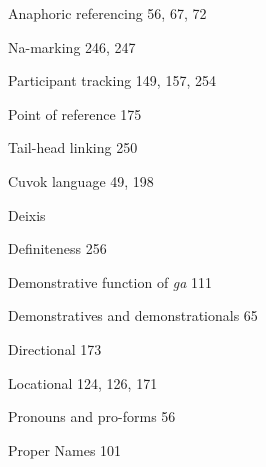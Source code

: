 \begin{multicols}{2}
\begin{styleindexii}
Anaphoric referencing  56, 67, 72
\end{styleindexii}

\begin{styleindexii}
Na-marking  246, 247
\end{styleindexii}

\begin{styleindexii}
Participant tracking  149, 157, 254
\end{styleindexii}

\begin{styleindexii}
Point of reference  175
\end{styleindexii}

\begin{styleindexii}
Tail-head linking  250
\end{styleindexii}

\begin{styleindexi}
Cuvok language  49, 198
\end{styleindexi}

\begin{styleindexi}
Deixis
\end{styleindexi}

\begin{styleindexii}
Definiteness  256
\end{styleindexii}

\begin{styleindexii}
Demonstrative function of \textit{ga}  111
\end{styleindexii}

\begin{styleindexii}
Demonstratives and demonstrationals  65
\end{styleindexii}

\begin{styleindexii}
Directional  173
\end{styleindexii}

\begin{styleindexii}
Locational  124, 126, 171
\end{styleindexii}

\begin{styleindexii}
Pronouns and pro-forms  56
\end{styleindexii}

\begin{styleindexii}
Proper Names  101
\end{styleindexii}


\end{multicols}

